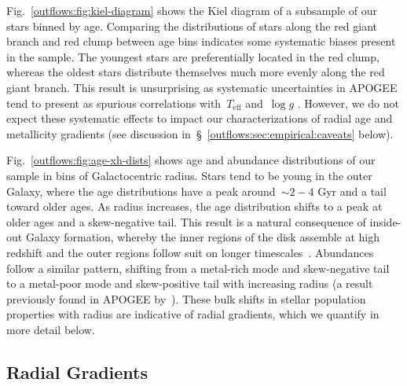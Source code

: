 Fig.~\ref{outflows:fig:kiel-diagram} shows the Kiel diagram of a subsample of
our stars binned by age.
Comparing the distributions of stars along the red giant branch and red clump
between age bins indicates some systematic biases present in the sample.
The youngest stars are preferentially located in the red clump, whereas the
oldest stars distribute themselves much more evenly along the red giant branch.
This result is unsurprising as systematic uncertainties in APOGEE tend to
present as spurious correlations with~$T_\text{eff}$ and~$\log g$
\citep[e.g.,][]{Joensson2018, Eilers2022}.
However, we do not expect these systematic effects to impact our
characterizations of radial age and metallicity gradients (see discussion
in~\S~\ref{outflows:sec:empirical:caveats} below).
\par
Fig.~\ref{outflows:fig:age-xh-dists} shows age and abundance distributions of
our sample in bins of Galactocentric radius.
Stars tend to be young in the outer Galaxy, where the age distributions have a
peak around~$\sim$$2-4$ Gyr and a tail toward older ages.
As radius increases, the age distribution shifts to a peak at older ages and a
skew-negative tail.
This result is a natural consequence of inside-out Galaxy formation, whereby
the inner regions of the disk assemble at high redshift and the outer regions
follow suit on longer timescales~\citep[e.g.,][]{White1991, Bird2013}.
Abundances follow a similar pattern, shifting from a metal-rich mode and
skew-negative tail to a metal-poor mode and skew-positive tail with increasing
radius (a result previously found in APOGEE by~\citealt{Hayden2015}).
These bulk shifts in stellar population properties with radius are indicative
of radial gradients, which we quantify in more detail below.


\subsection{Radial Gradients}
\label{outflows:sec:empirical:gradients}

